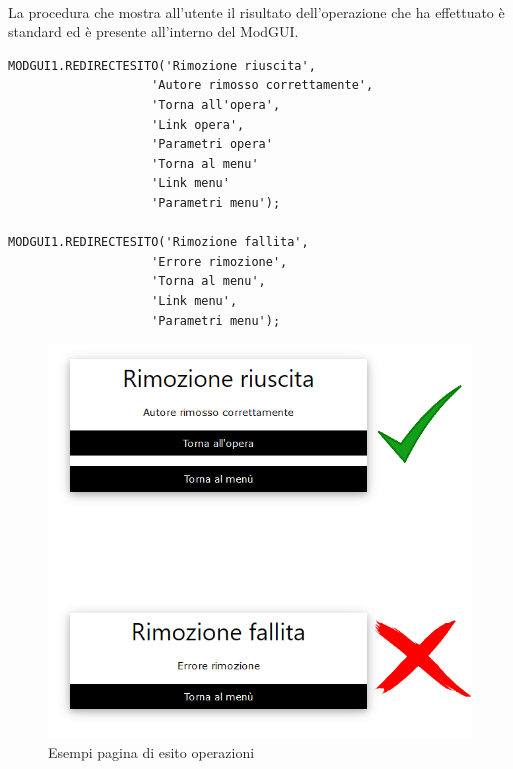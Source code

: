 \documentclass[a4paper, 12pt]{report}
\begin{document}
            \paragraph{}La procedura che mostra all'utente il risultato dell'operazione che ha effettuato è standard ed è presente
            all'interno del ModGUI.
            \begin{verbatim}
MODGUI1.REDIRECTESITO('Rimozione riuscita',
                    'Autore rimosso correttamente',
                    'Torna all'opera',
                    'Link opera',
                    'Parametri opera'
                    'Torna al menu'
                    'Link menu'
                    'Parametri menu');

MODGUI1.REDIRECTESITO('Rimozione fallita',
                    'Errore rimozione',
                    'Torna al menu',
                    'Link menu',
                    'Parametri menu');
            \end{verbatim}
            \begin{figure}[httb]
                \centering
                \includegraphics[scale=0.5]{Immagini/esitiOperazione.png}
                \caption{Esempi pagina di esito operazioni}
            \end{figure}
\end{document}
